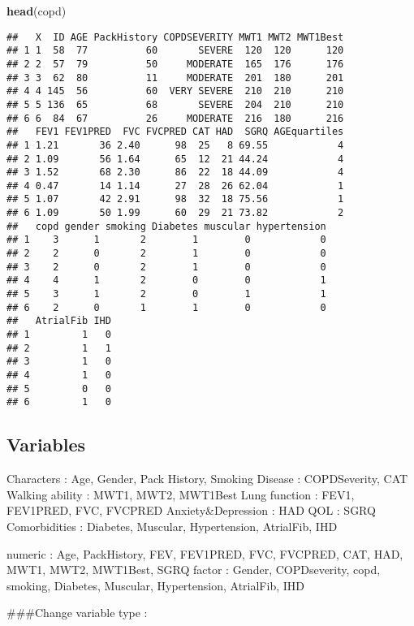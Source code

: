 \documentclass[
]{article}
\newenvironment{Shaded}{\begin{snugshade}}{\end{snugshade}}
\newcommand{\FunctionTok}[1]{\textcolor[rgb]{0.13,0.29,0.53}{\textbf{#1}}}
\newcommand{\NormalTok}[1]{#1}
\begin{document}
\begin{Shaded}
\begin{Highlighting}[]
\FunctionTok{head}\NormalTok{(copd)}
\end{Highlighting}
\end{Shaded}

\begin{verbatim}
##   X  ID AGE PackHistory COPDSEVERITY MWT1 MWT2 MWT1Best
## 1 1  58  77          60       SEVERE  120  120      120
## 2 2  57  79          50     MODERATE  165  176      176
## 3 3  62  80          11     MODERATE  201  180      201
## 4 4 145  56          60  VERY SEVERE  210  210      210
## 5 5 136  65          68       SEVERE  204  210      210
## 6 6  84  67          26     MODERATE  216  180      216
##   FEV1 FEV1PRED  FVC FVCPRED CAT HAD  SGRQ AGEquartiles
## 1 1.21       36 2.40      98  25   8 69.55            4
## 2 1.09       56 1.64      65  12  21 44.24            4
## 3 1.52       68 2.30      86  22  18 44.09            4
## 4 0.47       14 1.14      27  28  26 62.04            1
## 5 1.07       42 2.91      98  32  18 75.56            1
## 6 1.09       50 1.99      60  29  21 73.82            2
##   copd gender smoking Diabetes muscular hypertension
## 1    3      1       2        1        0            0
## 2    2      0       2        1        0            0
## 3    2      0       2        1        0            0
## 4    4      1       2        0        0            1
## 5    3      1       2        0        1            1
## 6    2      0       1        1        0            0
##   AtrialFib IHD
## 1         1   0
## 2         1   1
## 3         1   0
## 4         1   0
## 5         0   0
## 6         1   0
\end{verbatim}

\subsection{Variables}\label{variables}

Characters : Age, Gender, Pack History, Smoking Disease : COPDSeverity,
CAT Walking ability : MWT1, MWT2, MWT1Best Lung function : FEV1,
FEV1PRED, FVC, FVCPRED Anxiety\&Depression : HAD QOL : SGRQ
Comorbidities : Diabetes, Muscular, Hypertension, AtrialFib, IHD

numeric : Age, PackHistory, FEV, FEV1PRED, FVC, FVCPRED, CAT, HAD, MWT1,
MWT2, MWT1Best, SGRQ factor : Gender, COPDseverity, copd, smoking,
Diabetes, Muscular, Hypertension, AtrialFib, IHD

\#\#\#Change variable type :
\end{document}
